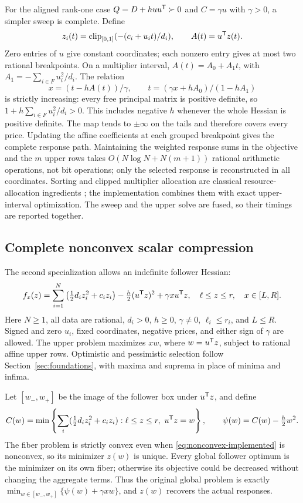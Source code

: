 For the aligned rank-one case $Q=D+h uu^{\mathsf T}\succ0$ and $C=\gamma u$ with
$\gamma>0$, a simpler sweep is complete. Define
\[
 z_i(t)=\operatorname{clip}_{[0,1]}(-(c_i+u_it)/d_i),\qquad A(t)=u^{\mathsf T} z(t).
\]
Zero entries of $u$ give constant coordinates; each nonzero entry gives at
most two rational breakpoints. On a multiplier interval,
$A(t)=A_0+A_1t$, with $A_1=-\sum_{i\in F}u_i^2/d_i$. The relation
\begin{equation}\label{eq:convex-sweep-inversion}
 x=(t-hA(t))/\gamma,\qquad
 t=(\gamma x+hA_0)/(1-hA_1)
\end{equation}
is strictly increasing: every free principal matrix is positive definite,
so $1+h\sum_{i\in F}u_i^2/d_i>0$. This includes negative $h$ whenever the
whole Hessian is positive definite. The map tends to $\pm\infty$ on the
tails and therefore covers every price. Updating the affine coefficients at
each grouped breakpoint gives the complete response path. Maintaining the
weighted response sums in the objective and the $m$ upper rows takes
$O(N\log N+N(m+1))$ rational arithmetic operations, not bit operations;
only the selected response is reconstructed in all coordinates. Sorting and
clipped multiplier allocation are classical resource-allocation ingredients \citep{Kiwiel2008}; the implementation
combines them with exact upper-interval optimization. The sweep and the upper
solve are fused, so their timings are reported together.

\subsection{Complete nonconvex scalar compression}
\label{subsec:nonconvex-compression}
The second specialization allows an indefinite follower Hessian:
\begin{equation}\label{eq:nonconvex-implemented}
 f_x(z)=\sum_{i=1}^N\left(\tfrac12d_i z_i^2+c_i z_i\right)
       -\tfrac h2(u^{\mathsf T} z)^2+\gamma x u^{\mathsf T} z,
 \quad \ell\le z\le r,\quad x\in[L,R].
\end{equation}
Here $N\ge1$, all data are rational, $d_i>0$, $h\ge0$, $\gamma\ne0$, $\ell_i\le r_i$,
and $L\le R$. Signed and zero $u_i$, fixed coordinates, negative prices,
and either sign of $\gamma$ are allowed. The upper problem maximizes $xw$,
where $w=u^{\mathsf T} z$, subject to rational affine upper rows. Optimistic and
pessimistic selection follow Section~\ref{sec:foundations}, with maxima and
suprema in place of minima and infima.

Let $[w_-,w_+]$ be the image of the follower box under $u^{\mathsf T} z$, and define
\begin{equation}\label{eq:scalar-fiber-value}
 C(w)=\min\left\{\sum_i(\tfrac12d_i z_i^2+c_i z_i):
                  \ell\le z\le r,\ u^{\mathsf T} z=w\right\},
 \qquad \psi(w)=C(w)-\tfrac h2w^2.
\end{equation}
The fiber problem is strictly convex even when \eqref{eq:nonconvex-implemented}
is nonconvex, so its minimizer $z(w)$ is unique. Every global follower optimum
is the minimizer on its own fiber; otherwise its objective could be decreased
without changing the aggregate terms. Thus the original global problem is
exactly $\min_{w\in[w_-,w_+]}\{\psi(w)+\gamma xw\}$, and $z(w)$ recovers the
actual responses.


